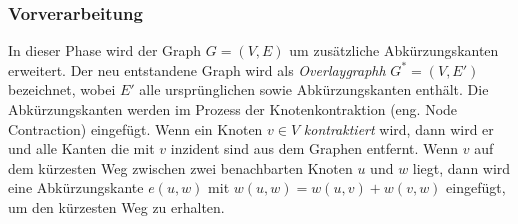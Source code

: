 \subsubsection{Vorverarbeitung}
In dieser Phase wird der Graph $G = (V,E)$ um zusätzliche Abkürzungskanten erweitert. Der neu
entstandene Graph wird als \emph{Overlaygraphh} $G^{*} = (V,E')$ bezeichnet, wobei $E'$ alle
ursprünglichen sowie Abkürzungskanten enthält. Die Abkürzungskanten werden im Prozess der
Knotenkontraktion (eng. Node Contraction) eingefügt. Wenn ein Knoten $v \in V$ \emph{kontraktiert}
wird, dann wird er und alle Kanten die mit $v$ inzident sind aus dem Graphen entfernt. Wenn $v$ auf
dem kürzesten Weg zwischen zwei benachbarten Knoten $u$ und $w$ liegt, dann wird eine
Abkürzungskante $e(u,w)$ mit $w(u,w) = w(u,v) + w(v,w)$ eingefügt, um den kürzesten Weg zu erhalten.

